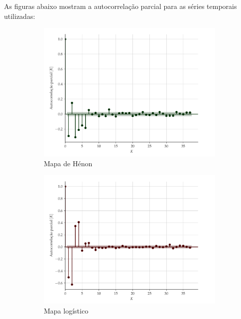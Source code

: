 \documentclass[9pt, technote]{article}
\begin{document}
As figuras abaixo mostram a autocorrelação parcial para as séries temporais utilizadas:
\begin{figure}[H]
     \begin{subfigure}[t]{0.24\textwidth}
         \includegraphics[scale=0.24]{autocorrelacao-parcial-henon.pdf}
         \caption{Mapa de Hénon}
     \end{subfigure}
     \centering
     \begin{subfigure}[t]{0.24\textwidth} 
         \includegraphics[scale=0.24]{autocorrelacao-parcial-logistic.pdf}
         \caption{Mapa logístico}
     \end{subfigure}
     \centering
     \begin{subfigure}[t]{0.24\textwidth}

\end{subfigure}
\end{figure}
\end{document}
